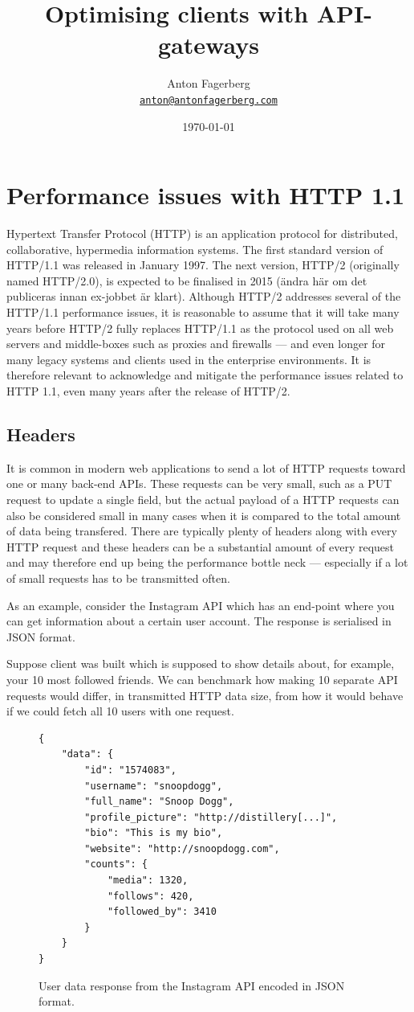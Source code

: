 \documentclass{cslthse-msc}
\author{
	Anton Fagerberg \\
	{\normalsize \href{mailto:anton@antonfagerberg.com}{\texttt{anton@antonfagerberg.com}}}
}
\title{Optimising clients with API-gateways}
\subtitle{}
\date{\today}
\begin{document}
\makefrontmatter

\chapter{Performance issues with HTTP 1.1}
Hypertext Transfer Protocol (HTTP) is an application protocol for distributed, collaborative, hypermedia information systems\cite{http-info}. The first standard version of HTTP/1.1 was released in January 1997\cite{rfc2068}. The next version, HTTP/2 (originally named HTTP/2.0), is expected to be finalised in 2015 (ändra här om det publiceras innan ex-jobbet är klart). Although HTTP/2 addresses several of the HTTP/1.1 performance issues, it is reasonable to assume that it will take many years before HTTP/2 fully replaces HTTP/1.1 as the protocol used on all web servers and middle-boxes such as proxies and firewalls --- and even longer for many legacy systems and clients used in the enterprise environments. It is therefore relevant to  acknowledge and mitigate the performance issues related to HTTP 1.1, even many years after the release of HTTP/2.

\section{Headers}
\label{headers}

It is common in modern web applications to send a lot of HTTP requests toward one or many back-end APIs. These requests can be very small, such as a PUT request to update a single field, but the actual payload of a HTTP requests can also be considered small in many cases when it is compared to the total amount of data being transfered. There are typically plenty of headers along with every HTTP request and these headers can be a substantial amount of every request and may therefore end up being the performance bottle neck --- especially if a lot of small requests has to be transmitted often.

As an example, consider the Instagram API\cite{instagram_api} which has an end-point where you can get information about a certain user account. The response is serialised in JSON format. 

Suppose client was built which is supposed to show details about, for example, your 10 most followed friends. We can benchmark how making 10 separate API requests would differ, in transmitted HTTP data size, from how it would behave if we could fetch all 10 users with one request.

\begin{figure}[H]
  \centering
    \begin{lstlisting}
{
    "data": {
        "id": "1574083",
        "username": "snoopdogg",
        "full_name": "Snoop Dogg",
        "profile_picture": "http://distillery[...]",
        "bio": "This is my bio",
        "website": "http://snoopdogg.com",
        "counts": {
            "media": 1320,
            "follows": 420,
            "followed_by": 3410
        }
    }
}
    \end{lstlisting}
  \caption{User data response from the Instagram API encoded in JSON format.}
\end{figure}
\end{document}
